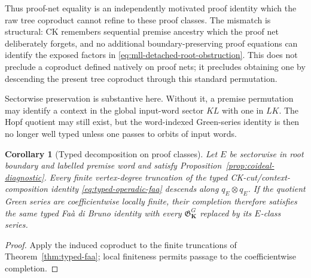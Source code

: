 \documentclass[10pt,a4paper]{article}
\theoremstyle{plain}
\newtheorem{corollary}[theorem]{Corollary}
\theoremstyle{definition}
\theoremstyle{remark}
\begin{document}
Thus proof-net equality is an independently motivated proof identity which
the raw tree coproduct cannot refine to these proof classes.  The mismatch is
structural: CK remembers sequential premise ancestry which the proof net
deliberately forgets, and no additional boundary-preserving proof equations
can identify the exposed factors in
\eqref{eq:mll-detached-root-obstruction}.  This does not preclude a coproduct
defined natively on proof nets; it precludes obtaining one by descending the
present tree coproduct through this standard permutation.

Sectorwise preservation is substantive here.  Without it, a premise
permutation may identify a context in the global input-word sector \(KL\)
with one in \(LK\).  The Hopf quotient may still exist, but the
word-indexed Green-series identity is then no longer well typed unless one
passes to orbits of input words.

\begin{corollary}[Typed decomposition on proof classes]
\label{cor:quotient-typed-faa}
Let \(E\) be sectorwise in root boundary and labelled premise word and
satisfy Proposition~\ref{prop:coideal-diagnostic}.  Every finite
vertex-degree truncation of the typed CK-cut/context-composition identity
\eqref{eq:typed-operadic-faa} descends along \(q_E\otimes q_E\).
If the quotient Green series are coefficientwise locally finite, their
completion therefore satisfies the same typed Fa\`a di Bruno identity
with every \(\mathfrak G_{\mathbf K}^{G}\) replaced by its
\(E\)-class series.
\end{corollary}

\begin{proof}
Apply the induced coproduct to the finite truncations of
Theorem~\ref{thm:typed-faa}; local finiteness permits passage to the
coefficientwise completion.
\end{proof}
\end{document}
